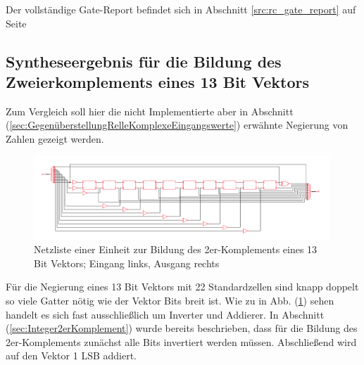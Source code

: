 Der vollständige Gate-Report befindet sich in Abschnitt \ref{src:rc_gate_report} auf Seite \pageref{src:rc_gate_report}



\subsection{Syntheseergebnis für die Bildung des Zweierkomplements eines 13 Bit Vektors}

Zum Vergleich soll hier die nicht Implementierte aber in Abschnitt (\ref{sec:GegenüberstellungRelleKomplexeEingangswerte}) erwähnte Negierung von Zahlen gezeigt werden.

\begin{figure}[htpb]
\centering
\includegraphics[width=0.99\textwidth]{img/13Bit_Inverter_Netlist.png}
\caption{Netzliste einer Einheit zur Bildung des 2er-Komplements eines 13 Bit Vektors; Eingang links, Ausgang rechts}
\label{pic:13BitInverter}
\end{figure}

Für die Negierung eines 13 Bit Vektors mit 22 Standardzellen sind knapp doppelt so viele Gatter nötig wie der Vektor Bits breit ist. Wie zu in Abb. (\ref{pic:13BitInverter})
sehen handelt es sich fast ausschließlich um Inverter und Addierer. In Abschnitt (\ref{sec:Integer2erKomplement}) wurde bereits beschrieben, dass für die Bildung des
2er-Komplements zunächst alle Bits invertiert werden müssen. Abschließend wird auf den Vektor 1 LSB addiert.
